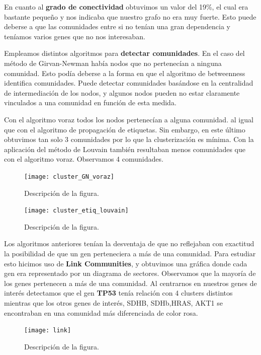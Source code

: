 En cuanto al \textbf{grado de conectividad} obtuvimos un valor del 19\%, el cual era bastante pequeño y nos indicaba que nuestro grafo no era muy fuerte. Esto puede deberse a que las comunidades entre si no tenían una gran dependencia y teníamos varios genes que no nos interesaban. 

\vspace{3pt}

Empleamos distintos algoritmos para \textbf{detectar comunidades}. En el caso del método de Girvan-Newman había nodos que no pertenecían a ninguna comunidad. Esto podía deberse a la forma en que el algoritmo de betweenness identifica comunidades. Puede detectar comunidades basándose en la centralidad de intermediación de los nodos, y algunos nodos pueden no estar claramente vinculados a una comunidad en función de esta medida.

\vspace{3pt}

Con el algoritmo voraz todos los nodos pertenecían a alguna comunidad. al igual que con el algoritmo de propagación de etiquetas. Sin embargo, en este último obtuvimos tan solo 3 comunidades por lo que la clusterización es mínima.  Con la aplicación del método de Louvain también resultaban menos comunidades que con el algoritmo voraz. Observamos 4 comunidades. 

\begin{figure}
	\centering
	\texttt{[image: cluster\_GN\_voraz]}
	\caption{Descripción de la figura.}
	\label{fig:cluster_GN_voraz}
\end{figure} 

\begin{figure}
	\centering
	\texttt{[image: cluster\_etiq\_louvain]}
	\caption{Descripción de la figura.}
	\label{fig:cluster_etiq_louvain}
\end{figure}

Los algoritmos anteriores tenían la desventaja de que no reflejaban con exactitud la posibilidad de que un gen perteneciera a más de una comunidad. Para estudiar esto hicimos uso de \textbf{Link Communities}, y obtuvimos una gráfica donde cada gen era representado por un diagrama de sectores. Observamos que la mayoría de los genes pertenecen a más de una comunidad. Al centrarnos en nuestros genes de interés detectamos que el gen \textbf{TP53} tenía relación con 4 clusters distintos mientras que los otros genes de interés, SDHB, SDHb,HRAS, AKT1 se encontraban en una comunidad más diferenciada de color rosa. 

\begin{figure}
	\centering
	\texttt{[image: link]}
	\caption{Descripción de la figura.}
	\label{fig:link}
\end{figure}



